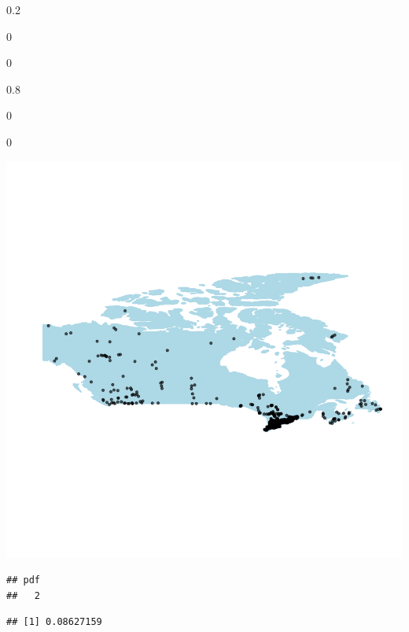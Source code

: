 \documentclass[]{article}
\begin{document}
{0.2}

{0}

{0}

{0.8}

{0}

{0}

\begin{center}\includegraphics{figures/map -1} \end{center}

\begin{verbatim}
## pdf 
##   2
\end{verbatim}

\begin{verbatim}
## [1] 0.08627159
\end{verbatim}
\end{document}
